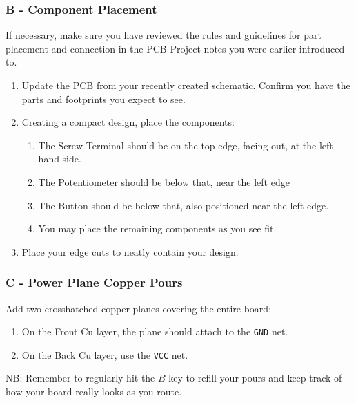 \documentclass[
  letterpaper,
  DIV=11,
  numbers=noendperiod,
  oneside]{scrartcl}
\providecommand{\tightlist}{%
  \setlength{\itemsep}{0pt}\setlength{\parskip}{0pt}}\usepackage{longtable,booktabs,array}
\begin{document}
\subsubsection{B - Component Placement}\label{b---component-placement}

If necessary, make sure you have reviewed the rules and guidelines for
part placement and connection in the PCB Project notes you were earlier
introduced to.

\begin{enumerate}
\def\labelenumi{\arabic{enumi}.}
\tightlist
\item
  Update the PCB from your recently created schematic. Confirm you have
  the parts and footprints you expect to see.
\item
  Creating a compact design, place the components:

  \begin{enumerate}
  \def\labelenumii{\alph{enumii}.}
  \tightlist
  \item
    The Screw Terminal should be on the top edge, facing out, at the
    left-hand side.
  \item
    The Potentiometer should be below that, near the left edge
  \item
    The Button should be below that, also positioned near the left edge.
  \item
    You may place the remaining components as you see fit.
  \end{enumerate}
\item
  Place your edge cuts to neatly contain your design.
\end{enumerate}

\subsubsection{C - Power Plane Copper
Pours}\label{c---power-plane-copper-pours}

Add two crosshatched copper planes covering the entire board:

\begin{enumerate}
\def\labelenumi{\arabic{enumi}.}
\tightlist
\item
  On the Front Cu layer, the plane should attach to the \texttt{GND}
  net.
\item
  On the Back Cu layer, use the \texttt{VCC} net.
\end{enumerate}

NB: Remember to regularly hit the \(B\) key to refill your pours and
keep track of how your board really looks as you route.
\end{document}
